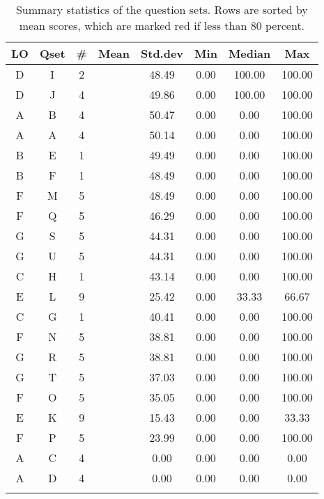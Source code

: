 \documentclass[12pt,english,nohyper]{tufte-handout}\usepackage[]{graphicx}\usepackage[]{color}
\begin{document}
\begin{fullwidth}
\makeatletter\setlength\hsize{\@tufte@fullwidth}\makeatother
\begin{longtable}{cc|ccc|ccc}
  \hline
LO & Qset & \# & Mean & Std.dev & Min & Median & Max \\ 
  \hline
D & I &   2 & \color{red}{64} & 48.49 & 0.00 & 100.00 & 100.00 \\ 
  D & J &   4 & \color{red}{58} & 49.86 & 0.00 & 100.00 & 100.00 \\ 
  A & B &   4 & \color{red}{48} & 50.47 & 0.00 & 0.00 & 100.00 \\ 
  A & A &   4 & \color{red}{44} & 50.14 & 0.00 & 0.00 & 100.00 \\ 
  B & E &   1 & \color{red}{40} & 49.49 & 0.00 & 0.00 & 100.00 \\ 
  B & F &   1 & \color{red}{36} & 48.49 & 0.00 & 0.00 & 100.00 \\ 
  F & M &   5 & \color{red}{36} & 48.49 & 0.00 & 0.00 & 100.00 \\ 
  F & Q &   5 & \color{red}{30} & 46.29 & 0.00 & 0.00 & 100.00 \\ 
  G & S &   5 & \color{red}{26} & 44.31 & 0.00 & 0.00 & 100.00 \\ 
  G & U &   5 & \color{red}{26} & 44.31 & 0.00 & 0.00 & 100.00 \\ 
  C & H &   1 & \color{red}{24} & 43.14 & 0.00 & 0.00 & 100.00 \\ 
  E & L &   9 & \color{red}{23.33} & 25.42 & 0.00 & 33.33 & 66.67 \\ 
  C & G &   1 & \color{red}{20} & 40.41 & 0.00 & 0.00 & 100.00 \\ 
  F & N &   5 & \color{red}{18} & 38.81 & 0.00 & 0.00 & 100.00 \\ 
  G & R &   5 & \color{red}{18} & 38.81 & 0.00 & 0.00 & 100.00 \\ 
  G & T &   5 & \color{red}{16} & 37.03 & 0.00 & 0.00 & 100.00 \\ 
  F & O &   5 & \color{red}{14} & 35.05 & 0.00 & 0.00 & 100.00 \\ 
  E & K &   9 & \color{red}{10} & 15.43 & 0.00 & 0.00 & 33.33 \\ 
  F & P &   5 & \color{red}{6} & 23.99 & 0.00 & 0.00 & 100.00 \\ 
  A & C &   4 & \color{red}{0} & 0.00 & 0.00 & 0.00 & 0.00 \\ 
  A & D &   4 & \color{red}{0} & 0.00 & 0.00 & 0.00 & 0.00 \\ 
   \hline
\hline
\caption{Summary statistics of the question sets. Rows are sorted by mean scores, which are marked red if less than 80 percent.} 
\label{tab:QuestionSet_summary}
\end{longtable}

\end{fullwidth}
\end{document}

